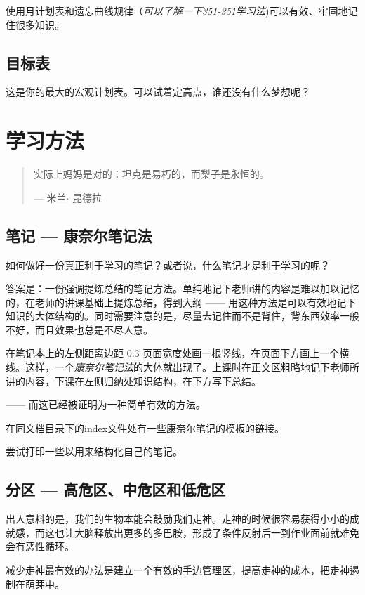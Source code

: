 \documentclass[b5paper]{ctexart}
\begin{document}
			使用月计划表和遗忘曲线规律（\emph{可以了解一下351-351学习法})可以有效、牢固地记住很多知识。

		\subsection{目标表}
			这是你的最大的宏观计划表。可以试着定高点，谁还没有什么梦想呢？

	\section{学习方法}
		\begin{quote}
			实际上妈妈是对的：坦克是易朽的，而梨子是永恒的。
			\begin{flushright}
				--- 米兰$\cdot$ 昆德拉
			\end{flushright}
		\end{quote}

		\subsection{笔记 --- 康奈尔笔记法}
			如何做好一份真正利于学习的笔记？或者说，什么笔记才是利于学习的呢？

			答案是：一份强调提炼总结的笔记方法。单纯地记下老师讲的内容是难以加以记忆的，在老师的讲课基础上提炼总结，得到大纲 ------ 用这种方法是可以有效地记下知识的大体结构的。同时需要注意的是，尽量去记住而不是背住，背东西效率一般不好，而且效果也总是不尽人意。

			在笔记本上的左侧距离边距 0.3 页面宽度处画一根竖线，在页面下方画上一个横线。这样，一个\emph{康奈尔笔记法}的大体就出现了。上课时在正文区粗略地记下老师所讲的内容，下课在左侧归纳处知识结构，在下方写下总结。

			------ 而这已经被证明为一种简单有效的方法。

			在同文档目录下的\href{index.html}{index文件}处有一些康奈尔笔记的模板的链接。

			尝试打印一些以用来结构化自己的笔记。

		\subsection{分区 --- 高危区、中危区和低危区}
			出人意料的是，我们的生物本能会鼓励我们走神。走神的时候很容易获得小小的成就感，而这也让大脑释放出更多的多巴胺，形成了条件反射后一到作业面前就难免会有恶性循环。

			减少走神最有效的办法是建立一个有效的手边管理区，提高走神的成本，把走神遏制在萌芽中。
\end{document}
